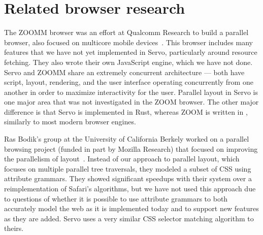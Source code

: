 %
\section{Related browser research}
\label{sec:rel}
The ZOOMM browser was an effort at Qualcomm Research to build a parallel browser, also
focused on multicore mobile devices~\cite{ZOOMM}.
This browser includes many features that we have not yet implemented in Servo, particularly
around resource fetching.
They also wrote their own JavaScript engine, which we have not done.
Servo and ZOOMM share an extremely concurrent architecture --- both have script, layout,
rendering, and the user interface operating concurrently from one another in order to maximize
interactivity for the user.
Parallel layout in Servo is one major area that was not investigated in the ZOOM browser.
The other major difference is that Servo is implemented in Rust, whereas ZOOM is written
in \Cplusplus, similarly to most modern browser engines.

Ras Bodik's group at the University of California Berkely worked on a parallel browsing
project (funded in part by Mozilla Research) that focused on improving the parallelism
of layout~\cite{parallel-layout}.
Instead of our approach to parallel layout, which focuses on multiple parallel tree
traversals, they modeled a subset of CSS using attribute grammars.
They showed significant speedups with their system over a reimplementation of Safari's
algorithms, but we have not used this approach due to questions of whether it is possible
to use attribute grammars to both accurately model the web as it is implemented today
and to support new features as they are added.
Servo uses a very similar CSS selector matching algorithm to theirs.
